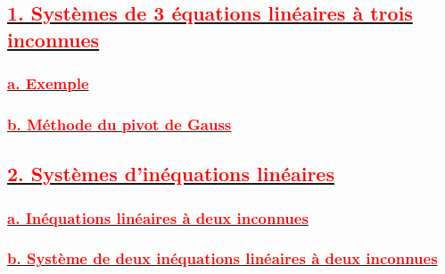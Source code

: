 \documentclass[12pt]{article}
\begin{document}
\subsection*{\underline{\textbf{\textcolor{red}{1. Systèmes de 3 équations linéaires à trois inconnues}}}}
\subsubsection*{\underline{\textbf{\textcolor{red}{a. Exemple}}}}
\subsubsection*{\underline{\textbf{\textcolor{red}{b. Méthode du pivot de Gauss }}}}
\subsection*{\underline{\textbf{\textcolor{red}{2. Systèmes d’inéquations linéaires }}}}
\subsubsection*{\underline{\textbf{\textcolor{red}{a. Inéquations linéaires à deux inconnues}}}}
\subsubsection*{\underline{\textbf{\textcolor{red}{b. Système de deux inéquations linéaires à deux inconnues }}}}
\end{document}
